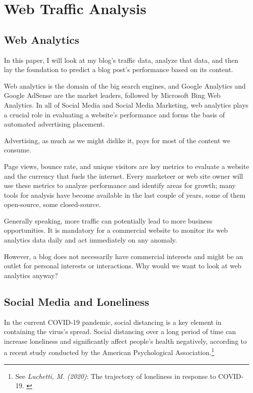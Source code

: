 %
%

\pagebreak
\section{Web Traffic Analysis}

\onehalfspacing

\subsection{Web Analytics}

In this paper, I will look at my blog's traffic data, analyze that data, and then lay the foundation to predict a blog post's performance based on its content.

Web analytics is the domain of the big search engines, and Google Analytics and Google AdSense are the market leaders, followed by Microsoft Bing Web Analytics. In all of Social Media and Social Media Marketing, web analytics plays a crucial role in evaluating a website's performance and forms the basis of automated advertising placement.

Advertising, as much as we might dislike it, pays for most of the content we consume.

Page views, bounce rate, and unique visitors are key metrics to evaluate a website and the currency that fuels the internet. Every marketeer or web site owner will use these metrics to analyze performance and identify areas for growth; many tools for analysis have become available in the last couple of years, some of them open-source, some closed-source.

Generally speaking, more traffic can potentially lead to more business opportunities. It is mandatory for a commercial website to monitor its web analytics data daily and act immediately on any anomaly.

However, a blog does not necessarily have commercial interests and might be an outlet for personal interests or interactions. Why would we want to look at web analytics anyway?

\subsection{Social Media and Loneliness}

In the current COVID-19 pandemic, social distancing is a key element in containing the virus's spread. Social distancing over a long period of time can increase loneliness and significantly affect people's health negatively, according to a recent study conducted by the American Psychological Association.\footnote{See \textit{Luchetti, M. (2020)}: The trajectory of loneliness in response to COVID-19. \cite{apaLoneliness}}

